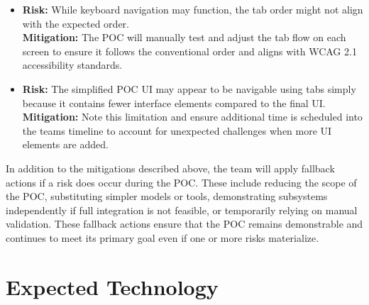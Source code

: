 \documentclass{article}
\begin{document}
\begin{itemize}
  \item \textbf{Risk:} While keyboard navigation may function, the tab order might not align with the expected order. \\
  \textbf{Mitigation:} The POC will manually test and adjust the tab flow on each screen to ensure it follows the conventional order and aligns with WCAG 2.1 accessibility standards.

  \item \textbf{Risk:} The simplified POC UI may appear to be navigable using tabs simply because it contains fewer interface elements compared to the final UI.\\
  \textbf{Mitigation:} Note this limitation and ensure additional time is scheduled into the teams timeline to account for unexpected challenges when more UI elements are added. 
  \end{itemize}

  In addition to the mitigations described above, the team will apply fallback actions if a risk does occur during the POC. These include reducing the scope of the POC, substituting simpler models or tools, demonstrating subsystems independently if full integration is not feasible, or temporarily relying on manual validation. These fallback actions ensure that the POC remains demonstrable and continues to meet its primary goal even if one or more risks materialize.

\section{Expected Technology}
\end{document}
